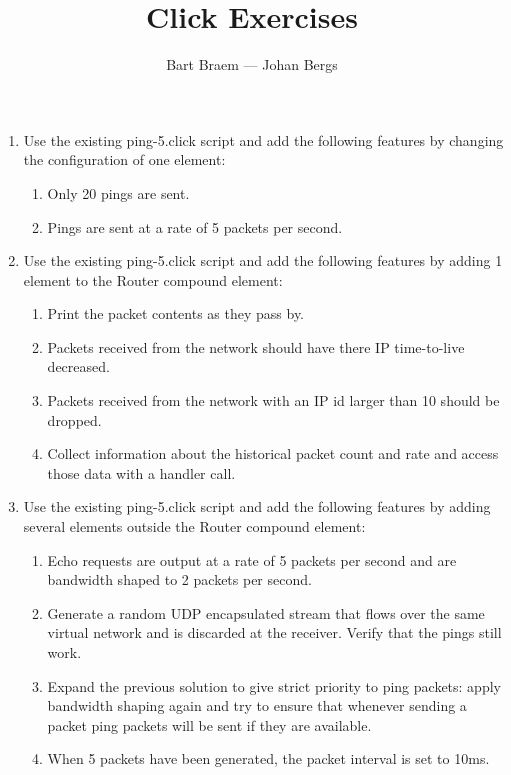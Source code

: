 \documentclass[a4paper]{article}
\author{Bart Braem --- Johan Bergs}
\date{}
\title{Click Exercises}
\begin{document}
\maketitle

\begin{enumerate}

\item Use the existing ping-5.click script and add the following features by changing the configuration of one element:

\begin{enumerate}
\item Only 20 pings are sent.
\item Pings are sent at a rate of 5 packets per second.
\end{enumerate}


\item Use the existing ping-5.click script and add the following features by adding 1 element to the Router compound element:

\begin{enumerate}
\item Print the packet contents as they pass by.
\item Packets received from the network should have there IP time-to-live decreased.
\item Packets received from the network with an IP id larger than 10 should be dropped.
\item Collect information about the historical packet count and rate and access those data with a handler call.
\end{enumerate}

\item Use the existing ping-5.click script and add the following features by adding several elements outside the Router compound element:

\begin{enumerate}
\item Echo requests are output at a rate of 5 packets per second and are bandwidth shaped to 2 packets per second.
\item Generate a random UDP encapsulated stream that flows over the same virtual network and is discarded at the receiver. Verify that the pings still work.
\item Expand the previous solution to give strict priority to ping packets: apply bandwidth shaping again and try to ensure that whenever sending a packet ping packets will be sent if they are available.
\item When 5 packets have been generated, the packet interval is set to 10ms.
\end{enumerate}


\end{enumerate}
\end{document}
